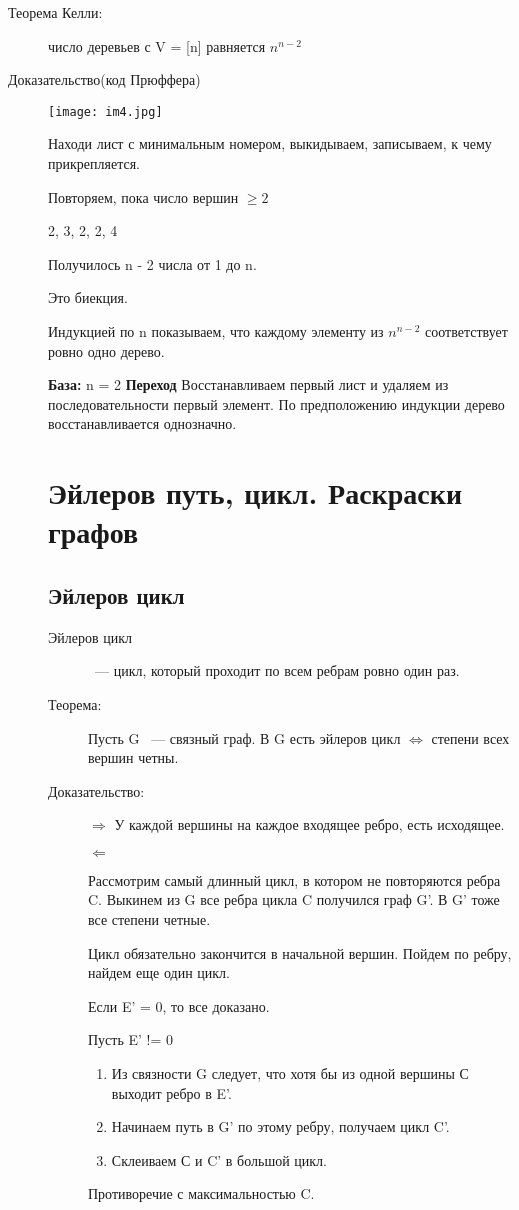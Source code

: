 \documentclass[12pt]{article}
\begin{document}
\begin{description}
\item[Теорема Келли:] число деревьев с V = [n] равняется $n^{n - 2}$
\item[Доказательство(код Прюффера)]

\begin{center} 
\texttt{[image: im4.jpg]} 
\end{center}

Находи лист с минимальным номером, выкидываем, записываем, к чему прикрепляется. 

Повторяем, пока число вершин $\ge 2$

2, 3, 2, 2, 4

Получилось n - 2 числа от 1 до n.

Это биекция.

Индукцией по n показываем, что каждому элементу из $n^{n - 2}$ соответствует ровно одно дерево. 

{\bf База:} n = 2
{\bf Переход} Восстанавливаем первый лист и удаляем из последовательности первый элемент. По предположению индукции дерево восстанавливается однозначно.

\section{Эйлеров путь, цикл. Раскраски графов}
\subsection{Эйлеров цикл}

\begin{description}
\item[Эйлеров цикл] ~--- цикл, который проходит по всем ребрам ровно один раз. 

\item[Теорема:] Пусть G ~--- связный граф. В G есть эйлеров цикл $\Leftrightarrow$ степени всех вершин четны. 

\item[Доказательство:] $\Rightarrow$ У каждой вершины на каждое входящее ребро, есть исходящее. 

$\Leftarrow$ 

Рассмотрим самый длинный цикл, в котором не повторяются ребра C. Выкинем из G все ребра цикла C получился граф G'. В G' тоже все степени четные. 

Цикл обязательно закончится в начальной вершин. Пойдем по ребру, найдем еще один цикл. 

Если E' = 0, то все доказано. 

Пусть E' != 0

\begin{enumerate}
\item Из связности G следует, что хотя бы из одной вершины С выходит ребро в E'.
\item Начинаем путь в G' по этому ребру, получаем цикл C'.
\item Склеиваем С и C' в большой цикл. 
\end{enumerate}

Противоречие с максимальностью C.
\end{description}
\end{description}
\end{document}
